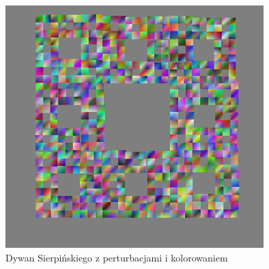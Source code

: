 \documentclass[12pt,a4paper,titlepage]{article}
\begin{document}
\begin{figure}[H]
\centering
\includegraphics[width = 10cm]{sierpinskiCarpet.png}
\caption{Dywan Sierpińskiego z perturbacjami i kolorowaniem}
\label{fig:sierpinskiCarpet}
\end{figure}
\end{document}

